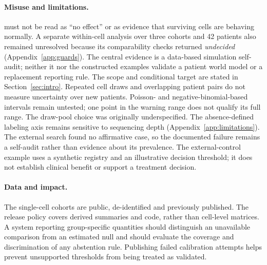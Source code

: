 \paragraph{Misuse and limitations.}
\notest{} must not be read as ``no effect'' or as evidence that surviving cells
are behaving normally. A separate within-cell analysis over three cohorts and
42 patients also remained unresolved because its comparability checks returned
\emph{undecided} (Appendix~\ref{app:guards}). The central evidence is a data-based simulation self-audit; neither it nor
the constructed examples validate a patient world model or a replacement
reporting rule. The scope and conditional target are stated in
Section~\ref{sec:intro}. Repeated cell draws and overlapping patient pairs
do not measure uncertainty over new patients. Poisson- and negative-binomial-based
intervals remain untested; one point in the warning range does not qualify
its full range. The draw-pool choice was originally underspecified.
The absence-defined labeling axis remains sensitive to sequencing depth
(Appendix~\ref{app:limitations}). The external search found no affirmative case, so the documented failure
remains a self-audit rather than evidence about its prevalence. The external-control
example uses a synthetic registry and an illustrative decision threshold;
it does not establish clinical benefit or support a treatment decision.

\paragraph{Data and impact.}
The single-cell cohorts are public, de-identified and previously published.
The release policy covers derived summaries and code, rather than cell-level
matrices. A system reporting group-specific quantities should distinguish an
unavailable comparison from an estimated null and should evaluate the coverage
and discrimination of any abstention rule. Publishing failed calibration
attempts helps prevent unsupported thresholds from being treated as validated.
